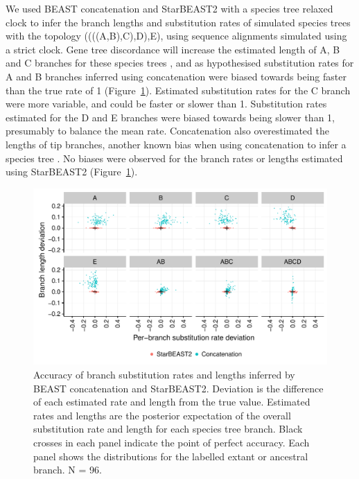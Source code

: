 \documentclass[12pt]{article}
\begin{document}
We used BEAST concatenation and StarBEAST2 with a species tree relaxed clock
to infer the branch lengths and substitution rates of simulated species trees
with the topology ((((A,B),C),D),E), using sequence alignments simulated using
a strict clock. Gene tree discordance will increase the estimated length of A,
B and C branches for these species trees \citep{Mendes01072016}, and as
hypothesised substitution rates for A and B branches inferred using
concatenation were biased towards being faster than the true rate of 1
(Figure~\ref{fig:spilsRates}). Estimated substitution rates for the C branch
were more variable, and could be faster or slower than 1. Substitution rates
estimated for the D and E branches were biased towards being slower than 1,
presumably to balance the mean rate. Concatenation also overestimated the
lengths of tip branches, another known bias when using concatenation to infer
a species tree \citep{Ogilvie01052016}. No biases were observed for the branch
rates or lengths estimated using StarBEAST2 (Figure~\ref{fig:spilsRates}).

\begin{figure}[htb!]
\centering
\includegraphics[width=130mm]{scatter.pdf}
\caption
{Accuracy of branch substitution rates and lengths inferred by BEAST
concatenation and StarBEAST2. Deviation is the difference of each estimated
rate and length from the true value. Estimated rates and lengths are the
posterior expectation of the overall substitution rate and length for each
species tree branch. Black crosses in each panel indicate the point of perfect
accuracy. Each panel shows the distributions for the labelled extant or
ancestral branch. N = 96.}
\label{fig:spilsRates}
\end{figure}
\end{document}
